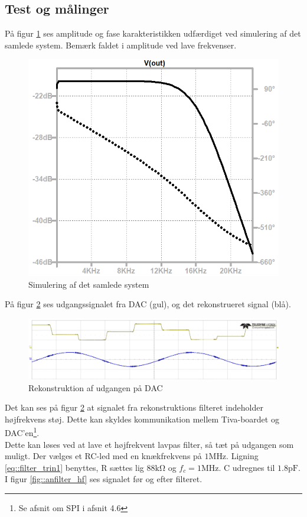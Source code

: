 \subsection{Test og målinger}
På figur \ref{fig::anfilter_sim_total} ses amplitude og fase karakteristikken udfærdiget ved simulering af det samlede system. Bemærk faldet i amplitude ved lave frekvenser.
\begin{figure}[h!]
	\centering
	\includegraphics[scale = 0.2]{./billeder/simtot.png}
	\caption{Simulering af det samlede system}
	\label{fig::anfilter_sim_total}
\end{figure}
\FloatBlock
På figur \ref{fig::anfilter_recon} ses udgangssignalet fra DAC (gul), og det rekonstrueret signal (blå).
\begin{figure}[h!]
	\centering
	\includegraphics[scale = 0.4]{./billeder/reconstruction}
	\caption{Rekonstruktion af udgangen på DAC}
	\label{fig::anfilter_recon}
\end{figure}
\FloatBlock


Det kan ses på figur \ref{fig::anfilter_recon} at signalet fra rekonstruktions filteret indeholder højfrekvens støj. Dette kan skyldes kommunikation mellem Tiva-boardet og DAC'en\footnote{Se afsnit om SPI i afsnit 4.6}. \\
Dette kan løses ved at lave et højfrekvent lavpas filter, så tæt på udgangen som muligt. Der vælges et RC-led med en knækfrekvens på $1\si{\mega\hertz}$. Ligning \ref{eq::filter_trin1} benyttes, R sættes lig $88\si{\kilo\ohm}$ og $f_c = 1\si{\mega\hertz}$. C udregnes til $1.8\si{\pico\farad}$. I figur \ref{fig::anfilter_hf} ses signalet før og efter filteret.



